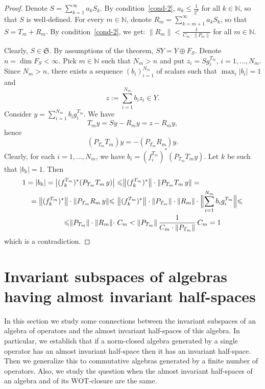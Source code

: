 \documentclass[12pt]{amsart}
\theoremstyle{plain}
\theoremstyle{definition}
\theoremstyle{remark}
\begin{document}
\begin{proof}
Denote $S=\sum\limits_{k=1}^\infty a_kS_k$. By condition~\eqref{cond-2},
$a_k{\leqslant}\tfrac{1}{2^k}$ for all $k\in\mathbb N$, so that $S$ is well-defined.
For every $m\in\mathbb N$, denote $R_m=\sum\limits_{k=m+1}^\infty a_kS_k$, so
that $S=T_m+R_m$. By condition~\eqref{cond-2}, we get:
${\lVert{R_m}\rVert}<\frac{1}{C_m\cdot{\lVert{P_m}\rVert}}$ for all $m\in\mathbb N$.

Clearly, $S\in\mathfrak S$. By assumptions of the theorem, $SY=Y\oplus F_S$.
Denote $n=\dim F_S<\infty$. Pick $m\in\mathbb N$ such that $N_m>n$ and put $z_i=Sg_i^{T_m}$, $i=1,\dots,N_m$. Since $N_m>n$, there exists a sequence
$(b_i)_{i=1}^{N_m}$ of scalars such that $\max_i{\lvert{b_i}\rvert}=1$ and 
$$
z:=\sum\limits_{i=1}^{N_m}b_iz_i\in Y.
$$
Consider $y=\sum\limits_{i=1}^{N_m}b_ig_i^{T_m}$. We have 
$$
T_my=Sy-R_my=z-R_my,
$$
hence 
$$
(P_{T_m}T_m)y=-(P_{T_m}R_m)y.
$$
Clearly, for each $i=1,\dots,N_m$, we have $b_i=(f_i^{T_m})^*(P_{T_m}T_my)$.
Let $k$ be such that ${\lvert{b_k}\rvert}=1$.
Then
\begin{equation*}
\begin{split}
1={\lvert{b_k}\rvert}={\bigl\lvert{(f_k^{T_m})^*(P_{T_m}T_m\,y)}\bigr\rvert}
&\ {\leqslant}{\bigl\lVert{(f_k^{T_m})^*}\bigr\rVert}\cdot{\lVert{P_{T_m}T_m\,y}\rVert}=\\
={\bigl\lVert{(f_k^{T_m})^*}\bigr\rVert}\cdot{\lVert{P_{T_m}R_m\,y}\rVert}
{\leqslant}&\ {\bigl\lVert{(f_k^{T_m})^*}\bigr\rVert}\cdot{\lVert{P_{T_m}}\rVert} \cdot{\lVert{R_m}\rVert}\cdot{\Bigl\lVert{\sum\limits_{i=1}^{N_m}b_ig_i^{T_m}}\Bigr\rVert}{\leqslant}\\
{\leqslant}{\lVert{P_{T_m}}\rVert}\cdot{\lVert{R_m}\rVert}\cdot&\ C_m
 <{\lVert{P_{T_m}}\rVert}\,\frac{1}{C_m\cdot{\lVert{P_{T_m}}\rVert}}\,C_m
=1
\end{split}
\end{equation*}
which is a contradiction.
\end{proof}

\section{Invariant subspaces of algebras having almost invariant half-spaces}
\label{inv-study}

In this section we study some connections between the invariant subspaces of an algebra of operators and the almost invariant half-spaces of this algebra. In particular, we establish that if a norm-closed algebra generated by a single operator has an almost invariant half-space then it has an invariant half-space. Then we generalize this to commutative algebras generated by a finite number of operators. Also, we study the question when the almost invariant half-spaces  of an algebra and of its WOT-closure are the same.
\end{document}
